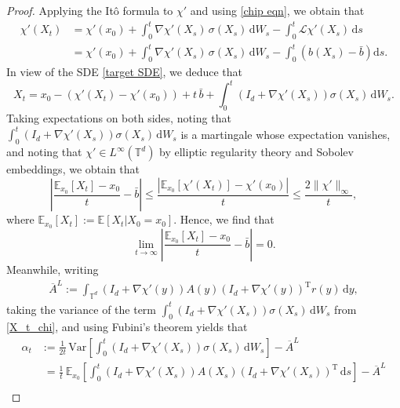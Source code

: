 \documentclass[10pt,a4paper]{amsart}
\begin{document}
\begin{proof}
     Applying the It\^{o} formula to $\chi'$ and using \eqref{chip eqn}, we obtain that
    \begin{align*}
            \chi'(X_t) &= \chi'(x_0) +\int_0^t \nabla \chi'(X_s)\, \sigma (X_s)\,\mathrm{d}W_s - \int_0^t\mathcal{L}\chi'(X_s)\, \mathrm{d}s\\
            &= \chi'(x_0) +\int_0^t \nabla \chi'(X_s)\, \sigma (X_s)\,\mathrm{d}W_s - \int_0^t \left(b(X_s)-\bar{b}\right) \mathrm{d}s.
    \end{align*}  
    In view of the SDE \eqref{target SDE}, we deduce that 
    \begin{equation}\label{X_t_chi}    
        X_t = x_0 - \left(\chi'(X_t) - \chi'(x_0)\right) + t\, \bar{b} + 
 \int_0^t \left(I_d + \nabla \chi'(X_s) \right) \sigma(X_s)\,\mathrm{d} W_s.
        \end{equation}
 Taking expectations on both sides, noting that $\int_0^t \left(I_d + \nabla \chi'(X_s) \right) \sigma(X_s)\,\mathrm{d} W_s$ is a martingale whose expectation vanishes, and noting that $\chi'\in L^{\infty}(\mathbb{T}^d)$ by elliptic regularity theory and Sobolev embeddings, we obtain that
\begin{equation}\label{moment_est}
        \left|\frac{\mathbb{E}_{x_0}[X_t] -x_0}{t} - \bar{b}\right| \le  \frac{\left|\mathbb{E}_{x_0}[\chi'(X_t)] - \chi'(x_0)\right|}{t}\le  \frac{ 2\|\chi'\|_{\infty}}{t},
\end{equation}
where $\mathbb{E}_{x_0}[X_t]:=\mathbb{E}[X_t|X_0 = x_0]$. Hence, we find that
\begin{equation*}
    \lim_{t\rightarrow \infty}\left|\frac{\mathbb{E}_{x_0}[X_t] -x_0}{t} - \bar{b}\right| = 0.
\end{equation*}
Meanwhile, writing 
\begin{align*}
    \overline{A}^L := \int_{\mathbb{T}^d} \left(I_d + \nabla \chi'(y)\right)A(y)\left(I_d+\nabla \chi'(y)\right)^{\mathrm{T}}r(y)\,\mathrm{d}y,
\end{align*}
taking the variance of the term $\int_0^t \left(I_d + \nabla \chi'(X_s)\right) \sigma(X_s)\,\mathrm{d} W_s$ from \eqref{X_t_chi}, and using Fubini's theorem yields that
\begin{align*}
        \alpha_t &:=\frac{1}{2t}\,\mathrm{Var}\left[\int_0^t \left(I_d + \nabla \chi'(X_s)\right)\sigma(X_s)\,\mathrm{d}W_s\right] - \overline{A}^L \\&\;= \frac{1}{t}\,\mathbb{E}_{x_0}\left[\int_0^t \left(I_d + \nabla \chi'(X_s)\right)A(X_s)\left(I_d + \nabla \chi'(X_s)\right)^{\mathrm{T}}\,\mathrm{d}s\right] - \overline{A}^L\\

\end{align*}
\end{proof}
\end{document}
